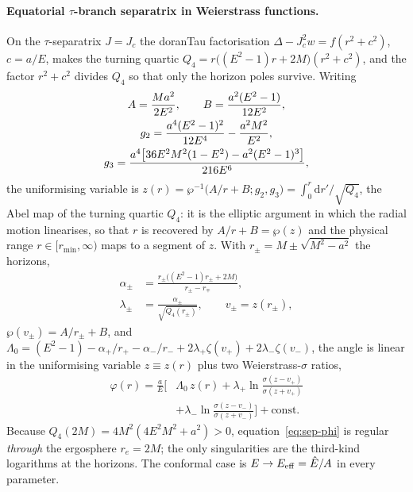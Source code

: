 \documentclass[12pt]{iopart}
\theoremstyle{plain}
\theoremstyle{definition}
\theoremstyle{remark}
\newcommand{\Ehat}{\hat E}
\newcommand{\re}{r_{e}}
\newcommand{\Jc}{J_{c}}
\newcommand{\dd}{\mathrm{d}}
\begin{document}
\paragraph{Equatorial $\tau$-branch separatrix in Weierstrass functions.} On the
$\tau$-separatrix $J=\Jc$ the doranTau factorisation $\Delta-\Jc^2 w=f(r^2+c^2)$,
$c=a/E$, makes the
turning quartic $Q_4=r\big((E^2-1)r+2M\big)(r^2+c^2)$, and the factor $r^2+c^2$
divides $Q_4$ so that only the horizon poles survive. Writing
\begin{gather}
    A=\frac{Ma^2}{2E^2},\qquad B=\frac{a^2(E^2-1)}{12E^2},\notag\\
    g_2=\frac{a^4(E^2-1)^2}{12E^4}-\frac{a^2M^2}{E^2},\notag\\
    g_3=\frac{a^4\big[36E^2M^2(1-E^2)-a^2(E^2-1)^3\big]}{216E^6},
    \label{eq:wp-invariants}
\end{gather}
the uniformising variable is $z(r)=\wp^{-1}\!\big(A/r+B;g_2,g_3\big)
=\int_0^r\dd r'/\sqrt{Q_4}$, the Abel map of the turning quartic $Q_4$: it is the
elliptic argument in which the radial motion linearises, so that $r$ is recovered
by $A/r+B=\wp(z)$ and the physical range $r\in[r_{\min},\infty)$ maps to a
segment of $z$. With $r_\pm=M\pm\sqrt{M^2-a^2}$ the horizons,
\begin{equation}
\begin{aligned}
    \alpha_\pm&=\frac{r_\pm\big((E^2-1)r_\pm+2M\big)}{r_\pm-r_\mp},\\
    \lambda_\pm&=\frac{\alpha_\pm}{\sqrt{Q_4(r_\pm)}},\qquad v_\pm=z(r_\pm),
\end{aligned}
\end{equation}
$\wp(v_\pm)=A/r_\pm+B$, and
$\Lambda_0=(E^2-1)-\alpha_+/r_+-\alpha_-/r_-+2\lambda_+\zeta(v_+)+2\lambda_-\zeta(v_-)$,
the angle is linear in the uniformising variable $z\equiv z(r)$ plus two
Weierstrass-$\sigma$ ratios,
\begin{equation}
\begin{split}
    \varphi(r)=\frac{a}{E}\Big[&\Lambda_0\,z(r)
      +\lambda_+\ln\frac{\sigma(z-v_+)}{\sigma(z+v_+)}\\
      &+\lambda_-\ln\frac{\sigma(z-v_-)}{\sigma(z+v_-)}\Big]+\text{const}.
\end{split}
    \label{eq:sep-phi}
\end{equation}
Because $Q_4(2M)=4M^2(4E^2M^2+a^2)>0$, equation~\eqref{eq:sep-phi} is regular
\emph{through} the ergosphere $\re=2M$; the only singularities are the
third-kind logarithms at the horizons. The conformal case is
$E\to E_{\rm eff}=\Ehat/A$ in every parameter.
\end{document}
